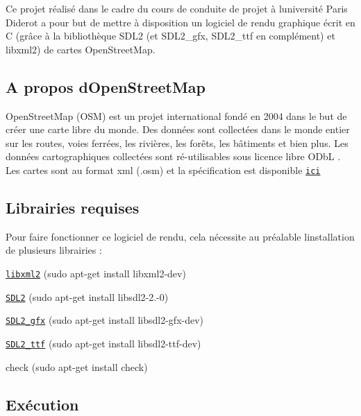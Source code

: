 Ce projet réalisé dans le cadre du cours de conduite de projet à l\textquotesingle{}université Paris Diderot a pour but de mettre à disposition un logiciel de rendu graphique écrit en C (grâce à la bibliothèque S\+D\+L2 (et S\+D\+L2\+\_\+gfx, S\+D\+L2\+\_\+ttf en complément) et libxml2) de cartes Open\+Street\+Map.

\subsection*{A propos d\textquotesingle{}Open\+Street\+Map}

Open\+Street\+Map (O\+SM) est un projet international fondé en 2004 dans le but de créer une carte libre du monde. Des données sont collectées dans le monde entier sur les routes, voies ferrées, les rivières, les forêts, les bâtiments et bien plus. Les données cartographiques collectées sont ré-\/utilisables sous licence libre O\+DbL . Les cartes sont au format xml (.osm) et la spécification est disponible \href{https://wiki.openstreetmap.org/wiki/Main_Page}{\tt ici}

\subsection*{Librairies requises}

Pour faire fonctionner ce logiciel de rendu, cela nécessite au préalable l\textquotesingle{}installation de plusieurs librairies \+:
\begin{DoxyItemize}
\item \href{http://www.xmlsoft.org/}{\tt libxml2} ({\ttfamily sudo apt-\/get install libxml2-\/dev})
\item \href{https://www.libsdl.org/}{\tt S\+D\+L2} ({\ttfamily sudo apt-\/get install libsdl2-\/2.-\/0})
\item \href{http://www.ferzkopp.net/Software/SDL2_gfx/Docs/html/index.html}{\tt S\+D\+L2\+\_\+gfx} ({\ttfamily sudo apt-\/get install libsdl2-\/gfx-\/dev})
\item \href{https://www.libsdl.org/projects/SDL_ttf/}{\tt S\+D\+L2\+\_\+ttf} ({\ttfamily sudo apt-\/get install libsdl2-\/ttf-\/dev})
\item check ({\ttfamily sudo apt-\/get install check})
\end{DoxyItemize}

\subsection*{Exécution}

